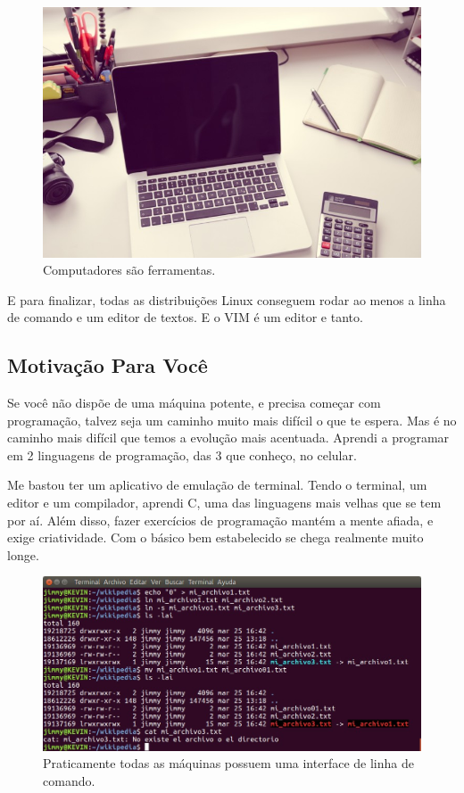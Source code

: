 \begin{figure}[!htb]
\centering
\includegraphics[scale=0.6]{motivacao/laptop-desk-notebook-computer.jpg}
\caption{Computadores são ferramentas.}
\end{figure}

E para finalizar, todas as distribuições Linux conseguem rodar ao menos a linha de comando e um editor de textos.
E o VIM é um editor e tanto.

\subsection{Motivação Para Você}
Se você não dispõe de uma máquina potente, e precisa começar com programação, talvez seja um caminho muito mais difícil o que te espera.
Mas é no caminho mais difícil que temos a evolução mais acentuada.
Aprendi a programar em 2 linguagens de programação, das 3 que conheço, no celular.

Me bastou ter um aplicativo de emulação de terminal.
Tendo o terminal, um editor e um compilador, aprendi C, uma das linguagens mais velhas que se tem por aí.
Além disso, fazer exercícios de programação mantém a mente afiada, e exige criatividade.
Com o básico bem estabelecido se chega realmente muito longe.

\begin{figure}[!h]
\centering
\includegraphics[scale=0.4]{motivacao/Linha_De_Comando.jpg}
\caption{Praticamente todas as máquinas possuem uma interface de linha de comando.}
\end{figure}

